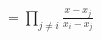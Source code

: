 \documentclass[preview]{standalone}
\begin{document}
\begin{align*}
= \prod_{j \neq i} \frac{x - x_j}{x_i - x_j}
\end{align*}
\end{document}
